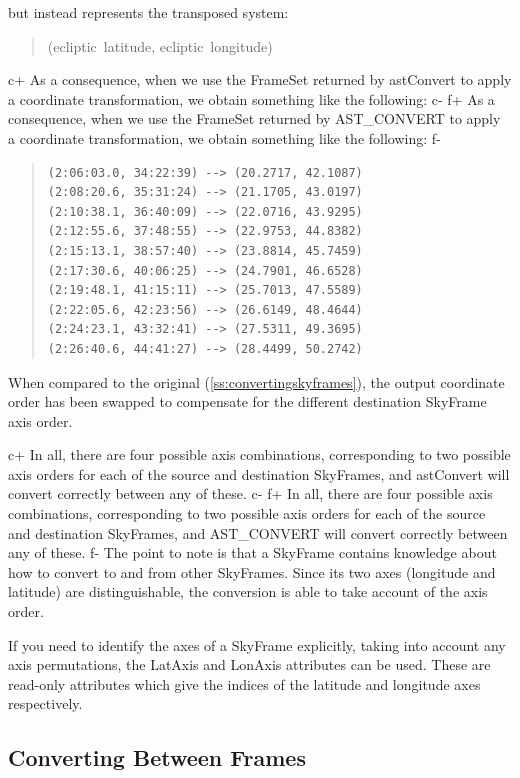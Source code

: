 \documentclass[twoside,11pt]{article}
\newcommand{\secref}[1]{\S\ref{#1}}
\renewcommand{\secref}[1]{\ref{#1}}
\begin{document}
but instead represents the transposed system:

\begin{quote}
(ecliptic~latitude, ecliptic~longitude)
\end{quote}

c+
As a consequence, when we use the FrameSet returned by astConvert to
apply a coordinate transformation, we obtain something like the
following:
c-
f+
As a consequence, when we use the FrameSet returned by AST\_CONVERT to
apply a coordinate transformation, we obtain something like the
following:
f-

\begin{quote}
\begin{verbatim}
(2:06:03.0, 34:22:39) --> (20.2717, 42.1087)
(2:08:20.6, 35:31:24) --> (21.1705, 43.0197)
(2:10:38.1, 36:40:09) --> (22.0716, 43.9295)
(2:12:55.6, 37:48:55) --> (22.9753, 44.8382)
(2:15:13.1, 38:57:40) --> (23.8814, 45.7459)
(2:17:30.6, 40:06:25) --> (24.7901, 46.6528)
(2:19:48.1, 41:15:11) --> (25.7013, 47.5589)
(2:22:05.6, 42:23:56) --> (26.6149, 48.4644)
(2:24:23.1, 43:32:41) --> (27.5311, 49.3695)
(2:26:40.6, 44:41:27) --> (28.4499, 50.2742)
\end{verbatim}
\end{quote}

When compared to the original (\secref{ss:convertingskyframes}), the
output coordinate order has been swapped to compensate for the
different destination SkyFrame axis order.

c+
In all, there are four possible axis combinations, corresponding to two
possible axis orders for each of the source and destination SkyFrames,
and astConvert will convert correctly between any of these.
c-
f+
In all, there are four possible axis combinations, corresponding to two
possible axis orders for each of the source and destination SkyFrames,
and AST\_CONVERT will convert correctly between any of these.
f-
The point to note is that a SkyFrame contains knowledge about how to
convert to and from other SkyFrames. Since its two axes (longitude and
latitude) are distinguishable, the conversion is able to take account
of the axis order.

If you need to identify the axes of a SkyFrame explicitly, taking into
account any axis permutations, the LatAxis and LonAxis attributes can be
used. These are read-only attributes which give the indices of the
latitude and longitude axes respectively.

\subsection{\label{ss:convertingframes}Converting Between Frames}
\end{document}
